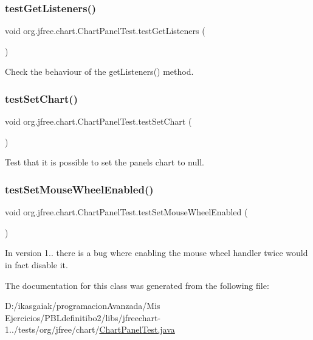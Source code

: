\subsubsection{\texorpdfstring{test\+Get\+Listeners()}{testGetListeners()}}
{\footnotesize\ttfamily void org.\+jfree.\+chart.\+Chart\+Panel\+Test.\+test\+Get\+Listeners (\begin{DoxyParamCaption}{ }\end{DoxyParamCaption})}

Check the behaviour of the get\+Listeners() method. \mbox{\label{classorg_1_1jfree_1_1chart_1_1_chart_panel_test_a3fcc257016e07e2f928581937ac04130}} 
\subsubsection{\texorpdfstring{test\+Set\+Chart()}{testSetChart()}}
{\footnotesize\ttfamily void org.\+jfree.\+chart.\+Chart\+Panel\+Test.\+test\+Set\+Chart (\begin{DoxyParamCaption}{ }\end{DoxyParamCaption})}

Test that it is possible to set the panel\textquotesingle{}s chart to null. \mbox{\label{classorg_1_1jfree_1_1chart_1_1_chart_panel_test_a24c28f5b7be79878a356764f21e6063f}} 
\subsubsection{\texorpdfstring{test\+Set\+Mouse\+Wheel\+Enabled()}{testSetMouseWheelEnabled()}}
{\footnotesize\ttfamily void org.\+jfree.\+chart.\+Chart\+Panel\+Test.\+test\+Set\+Mouse\+Wheel\+Enabled (\begin{DoxyParamCaption}{ }\end{DoxyParamCaption})}

In version 1.. there is a bug where enabling the mouse wheel handler twice would in fact disable it. 

The documentation for this class was generated from the following file\+:\begin{DoxyCompactItemize}
\item 
D\+:/ikasgaiak/programacion\+Avanzada/\+Mis Ejercicios/\+P\+B\+Ldefinitibo2/libs/jfreechart-\/1../tests/org/jfree/chart/\mbox{\hyperlink{_chart_panel_test_8java}{Chart\+Panel\+Test.\+java}}\end{DoxyCompactItemize}

